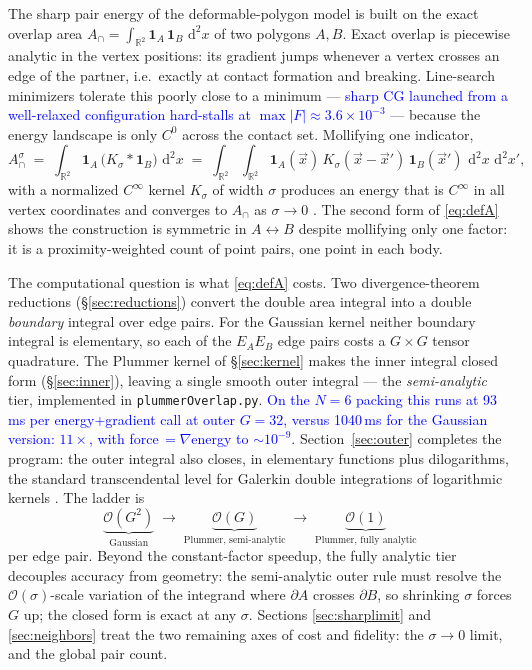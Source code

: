 \documentclass[11pt]{article}
\newcommand{\aside}[1]{\textcolor{blue}{#1}}
\newcommand{\dd}{\,\mathrm{d}}
\newcommand{\Acap}{A^{\sigma}_{\cap}}
\begin{document}
The sharp pair energy of the deformable-polygon model is built on the exact overlap
area $A_\cap = \int_{\mathbb R^2} \mathbf 1_A\,\mathbf 1_B\,\dd^2x$ of two polygons
$A,B$.  Exact overlap is piecewise analytic in the vertex positions: its gradient
jumps whenever a vertex crosses an edge of the partner, i.e.\ exactly at contact
formation and breaking.  Line-search minimizers tolerate this poorly close to a
minimum --- \aside{sharp CG launched from a well-relaxed configuration hard-stalls at
$\max|F|\approx 3.6\times10^{-3}$} --- because the energy landscape is only $C^0$
across the contact set.  Mollifying one indicator,
\begin{equation}
  \Acap \;=\; \int_{\mathbb R^2} \mathbf 1_A\,\bigl(K_\sigma * \mathbf 1_B\bigr)\,\dd^2x
  \;=\; \int_{\mathbb R^2}\!\!\int_{\mathbb R^2}
        \mathbf 1_A(\vec x)\,K_\sigma(\vec x-\vec x')\,\mathbf 1_B(\vec x')\,
        \dd^2x\,\dd^2x' ,
  \label{eq:defA}
\end{equation}
with a normalized $C^\infty$ kernel $K_\sigma$ of width $\sigma$ produces an energy
that is $C^\infty$ in all vertex coordinates and converges to $A_\cap$ as
$\sigma\to0$ \cite{Friedrichs1944,Evans2010}.  The second form of \eqref{eq:defA}
shows the construction is symmetric in $A\leftrightarrow B$ despite mollifying only
one factor: it is a proximity-weighted count of point pairs, one point in each body.

The computational question is what \eqref{eq:defA} costs.  Two divergence-theorem
reductions (\S\ref{sec:reductions}) convert the double area integral into a double
\emph{boundary} integral over edge pairs.  For the Gaussian kernel neither boundary
integral is elementary, so each of the $E_A E_B$ edge pairs costs a $G\times G$ tensor
quadrature.  The Plummer kernel of \S\ref{sec:kernel} makes the inner integral closed
form (\S\ref{sec:inner}), leaving a single smooth outer integral --- the
\emph{semi-analytic} tier, implemented in \texttt{plummerOverlap.py}.
\aside{On the $N=6$ packing this runs at 93\,ms per energy+gradient call at outer
$G=32$, versus 1040\,ms for the Gaussian version: $11\times$, with
force$\,=\nabla$energy to $\sim10^{-9}$.}  Section~\ref{sec:outer} completes the
program: the outer integral also closes, in elementary functions plus dilogarithms,
the standard transcendental level for Galerkin double integrations of logarithmic
kernels \cite{Salvadori2002,Carini1999,SauterSchwab2011}.  The ladder is
\[
  \underbrace{\mathcal O(G^2)}_{\text{Gaussian}}
  \;\longrightarrow\;
  \underbrace{\mathcal O(G)}_{\text{Plummer, semi-analytic}}
  \;\longrightarrow\;
  \underbrace{\mathcal O(1)}_{\text{Plummer, fully analytic}}
\]
per edge pair.  Beyond the constant-factor speedup, the fully analytic tier decouples
accuracy from geometry: the semi-analytic outer rule must resolve the
$\mathcal O(\sigma)$-scale variation of the integrand where $\partial A$ crosses
$\partial B$, so shrinking $\sigma$ forces $G$ up; the closed form is exact at any
$\sigma$.  Sections \ref{sec:sharplimit} and \ref{sec:neighbors} treat the two
remaining axes of cost and fidelity: the $\sigma\to0$ limit, and the global pair
count.
\end{document}
